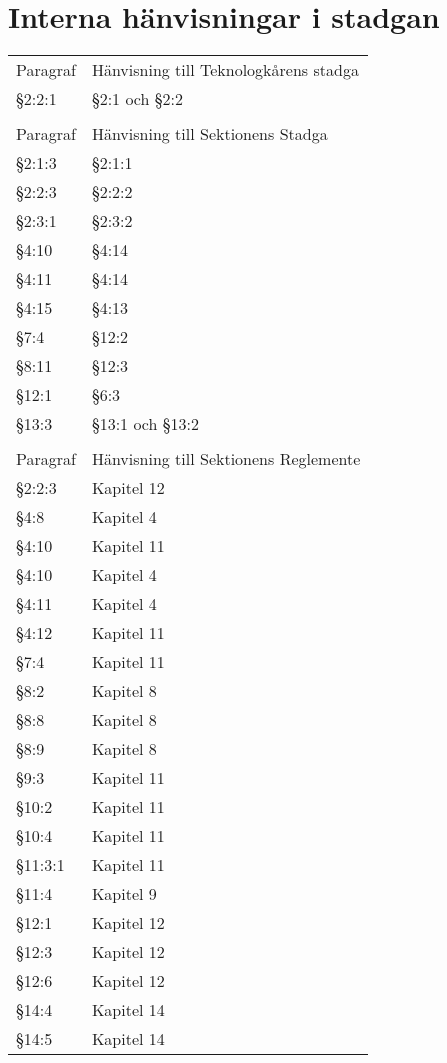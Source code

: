 \documentclass[10pt]{article}
\begin{document}
    \section*{Interna hänvisningar i stadgan}
    \renewcommand*\arraystretch{1}
    \begin{tabular}{p{15mm} p{90mm}}
        Paragraf & Hänvisning till Teknologkårens stadga\\
        §2:2:1 & §2:1 och §2:2\\
        &\\
        Paragraf & Hänvisning till Sektionens Stadga\\
        §2:1:3 & §2:1:1\\
        §2:2:3 & §2:2:2\\
        §2:3:1 & §2:3:2\\
        §4:10 & §4:14\\
        §4:11 & §4:14\\
        §4:15 & §4:13\\
        §7:4 & §12:2\\
        §8:11 & §12:3\\
        §12:1 & §6:3\\
        §13:3 & §13:1 och §13:2\\
        &\\
        Paragraf & Hänvisning till Sektionens Reglemente\\
        §2:2:3 & Kapitel 12\\
        §4:8 & Kapitel 4\\
        §4:10 & Kapitel 11\\
        §4:10 & Kapitel 4\\
        §4:11 & Kapitel 4\\
        §4:12 & Kapitel 11\\
        §7:4 & Kapitel 11\\
        §8:2 & Kapitel 8\\
        §8:8 & Kapitel 8\\
        §8:9 & Kapitel 8\\
        §9:3 & Kapitel 11\\
        §10:2 & Kapitel 11\\
        §10:4 & Kapitel 11\\
        §11:3:1 & Kapitel 11\\
        §11:4 & Kapitel 9\\
        §12:1 & Kapitel 12\\
        §12:3 & Kapitel 12\\
        §12:6 & Kapitel 12\\
        §14:4 & Kapitel 14\\
        §14:5 & Kapitel 14\\
    \end{tabular}
    \renewcommand*\arraystretch{1.3}
    
\end{document}
